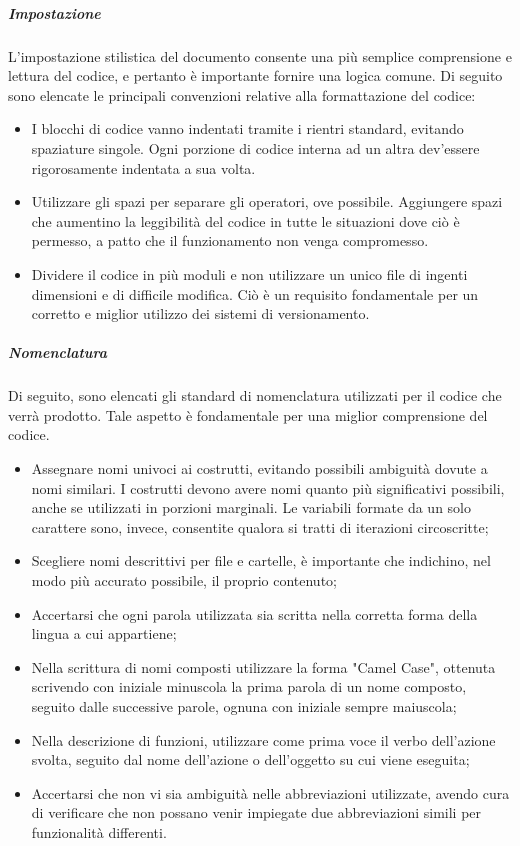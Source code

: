 			\subparagraph{Impostazione}
			L'impostazione stilistica del documento consente una più semplice comprensione e lettura del codice, e pertanto è importante fornire una logica comune. Di seguito sono elencate le principali convenzioni relative alla formattazione del codice: 
			\begin{itemize}
				\item
				I blocchi di codice vanno indentati tramite i rientri standard, evitando spaziature singole. Ogni porzione di codice interna ad un altra dev'essere rigorosamente indentata a sua volta.
				\item
				Utilizzare gli spazi per separare gli operatori, ove possibile. Aggiungere spazi che aumentino la leggibilità del codice in tutte le situazioni dove ciò è permesso, a patto che il funzionamento non venga compromesso.
				\item
				Dividere il codice in più moduli e non utilizzare un unico file di ingenti dimensioni e di difficile modifica. Ciò è un requisito fondamentale per un corretto e miglior utilizzo dei sistemi di versionamento.
			\end{itemize}
	
			\subparagraph{Nomenclatura}
			Di seguito, sono elencati gli standard di nomenclatura utilizzati per il codice che verrà prodotto. Tale aspetto è fondamentale per una miglior comprensione del codice.
			\begin{itemize}
			\item Assegnare nomi univoci ai costrutti, evitando possibili ambiguità dovute a nomi similari. I costrutti devono avere nomi quanto più significativi possibili, anche se utilizzati in porzioni marginali. Le variabili formate da un solo carattere sono, invece, consentite qualora si tratti di iterazioni circoscritte;
			\item Scegliere nomi descrittivi per file e cartelle, è importante che indichino, nel modo più accurato possibile, il proprio contenuto;
			\item Accertarsi che ogni parola utilizzata sia scritta nella corretta forma della lingua a cui appartiene;
			\item Nella scrittura di nomi composti utilizzare la forma "Camel Case", ottenuta scrivendo con iniziale minuscola la prima parola di un nome composto, seguito dalle successive parole, ognuna con iniziale sempre maiuscola;
			\item Nella descrizione di funzioni, utilizzare come prima voce il verbo dell'azione svolta, seguito dal nome dell'azione o dell'oggetto su cui viene eseguita;
			\item Accertarsi che non vi sia ambiguità nelle abbreviazioni utilizzate, avendo cura di verificare che non possano venir impiegate due abbreviazioni simili per funzionalità differenti.
			\end{itemize}
			
